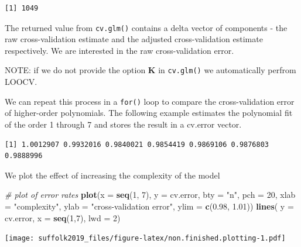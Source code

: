 \documentclass[]{article}
\newenvironment{Shaded}{\begin{snugshade}}{\end{snugshade}}
\newcommand{\CommentTok}[1]{\textcolor[rgb]{0.56,0.35,0.01}{\textit{#1}}}
\newcommand{\ControlFlowTok}[1]{\textcolor[rgb]{0.13,0.29,0.53}{\textbf{#1}}}
\newcommand{\DataTypeTok}[1]{\textcolor[rgb]{0.13,0.29,0.53}{#1}}
\newcommand{\DecValTok}[1]{\textcolor[rgb]{0.00,0.00,0.81}{#1}}
\newcommand{\FloatTok}[1]{\textcolor[rgb]{0.00,0.00,0.81}{#1}}
\newcommand{\KeywordTok}[1]{\textcolor[rgb]{0.13,0.29,0.53}{\textbf{#1}}}
\newcommand{\NormalTok}[1]{#1}
\newcommand{\OperatorTok}[1]{\textcolor[rgb]{0.81,0.36,0.00}{\textbf{#1}}}
\newcommand{\OtherTok}[1]{\textcolor[rgb]{0.56,0.35,0.01}{#1}}
\newcommand{\StringTok}[1]{\textcolor[rgb]{0.31,0.60,0.02}{#1}}
\begin{document}
\begin{verbatim}
[1] 1049
\end{verbatim}

The returned value from \texttt{cv.glm()} contains a delta vector of components - the raw cross-validation estimate and the adjusted cross-validation estimate respectively. We are interested in the raw cross-validation error.

NOTE: if we do not provide the option \textbf{K} in \texttt{cv.glm()} we automatically perfrom LOOCV.

We can repeat this process in a \texttt{for()} loop to compare the cross-validation error of higher-order polynomials. The following example estimates the polynomial fit of the order 1 through 7 and stores the result in a cv.error vector.

\begin{Shaded}
\end{Shaded}

\begin{verbatim}
[1] 1.0012907 0.9932016 0.9840021 0.9854419 0.9869106 0.9876803 0.9888996
\end{verbatim}

We plot the effect of increasing the complexity of the model

\begin{Shaded}
\begin{Highlighting}[]
\CommentTok{# plot of error rates}
\KeywordTok{plot}\NormalTok{(}\DataTypeTok{x =} \KeywordTok{seq}\NormalTok{(}\DecValTok{1}\NormalTok{, }\DecValTok{7}\NormalTok{),}
     \DataTypeTok{y =}\NormalTok{ cv.error,}
     \DataTypeTok{bty =} \StringTok{"n"}\NormalTok{, }
     \DataTypeTok{pch =} \DecValTok{20}\NormalTok{,}
     \DataTypeTok{xlab =} \StringTok{"complexity"}\NormalTok{, }
     \DataTypeTok{ylab =} \StringTok{"cross-validation error"}\NormalTok{,}
     \DataTypeTok{ylim =} \KeywordTok{c}\NormalTok{(}\FloatTok{0.98}\NormalTok{, }\FloatTok{1.01}\NormalTok{))}
\KeywordTok{lines}\NormalTok{( }\DataTypeTok{y =}\NormalTok{ cv.error, }\DataTypeTok{x =} \KeywordTok{seq}\NormalTok{(}\DecValTok{1}\NormalTok{,}\DecValTok{7}\NormalTok{), }\DataTypeTok{lwd =} \DecValTok{2}\NormalTok{)}
\end{Highlighting}
\end{Shaded}

\texttt{[image: suffolk2019\_files/figure-latex/non.finished.plotting-1.pdf]}
\end{document}
